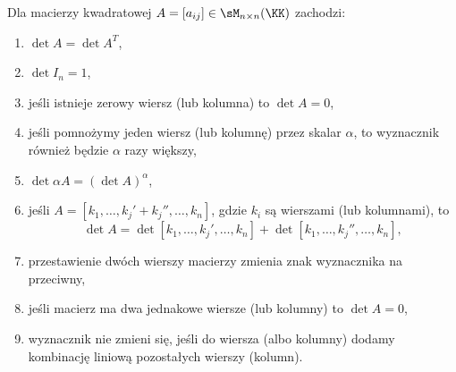 \begin{theorem}
    \label{t:determinant properties}
    Dla macierzy kwadratowej $A = [a_{ij}] \in \sM_{n\times n}(\KK)$ zachodzi:
    \begin{enumerate}
        \item $\det A = \det A^T$,
        \item $\det I_n = 1$,
        \item jeśli istnieje zerowy wiersz (lub kolumna) to $\det A = 0$,
        \item jeśli pomnożymy jeden wiersz (lub kolumnę) przez skalar $\alpha$, to wyznacznik również będzie $\alpha$ razy większy,
        \item $\det \alpha A = (\det A) ^ \alpha$,
        \item \label{t:p:determinant of a matrix with sum} jeśli $A = [k_1, \ldots, k_j' + k_j'', \ldots, k_n]$, gdzie $k_i$ są wierszami (lub kolumnami), to
              \[ \det A = \det [k_1, \ldots, k_j', \ldots, k_n] + \det [k_1, \ldots, k_j'', \ldots, k_n], \]
        \item przestawienie dwóch wierszy macierzy zmienia znak wyznacznika na przeciwny,
        \item \label{t:p:determinant of a matrix with same rows} jeśli macierz ma dwa jednakowe wiersze (lub kolumny) to $\det A = 0$,
        \item wyznacznik nie zmieni się, jeśli do wiersza (albo kolumny) dodamy kombinację liniową pozostałych wierszy (kolumn).
    \end{enumerate}
\end{theorem}
